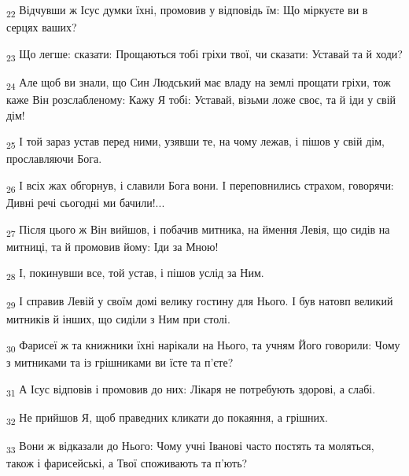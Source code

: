 \begin{tcolorbox}
\textsubscript{22} Відчувши ж Ісус думки їхні, промовив у відповідь їм: Що міркуєте ви в серцях ваших?
\end{tcolorbox}
\begin{tcolorbox}
\textsubscript{23} Що легше: сказати: Прощаються тобі гріхи твої, чи сказати: Уставай та й ходи?
\end{tcolorbox}
\begin{tcolorbox}
\textsubscript{24} Але щоб ви знали, що Син Людський має владу на землі прощати гріхи, тож каже Він розслабленому: Кажу Я тобі: Уставай, візьми ложе своє, та й іди у свій дім!
\end{tcolorbox}
\begin{tcolorbox}
\textsubscript{25} І той зараз устав перед ними, узявши те, на чому лежав, і пішов у свій дім, прославляючи Бога.
\end{tcolorbox}
\begin{tcolorbox}
\textsubscript{26} І всіх жах обгорнув, і славили Бога вони. І переповнились страхом, говорячи: Дивні речі сьогодні ми бачили!...
\end{tcolorbox}
\begin{tcolorbox}
\textsubscript{27} Після цього ж Він вийшов, і побачив митника, на ймення Левія, що сидів на митниці, та й промовив йому: Іди за Мною!
\end{tcolorbox}
\begin{tcolorbox}
\textsubscript{28} І, покинувши все, той устав, і пішов услід за Ним.
\end{tcolorbox}
\begin{tcolorbox}
\textsubscript{29} І справив Левій у своїм домі велику гостину для Нього. І був натовп великий митників й інших, що сиділи з Ним при столі.
\end{tcolorbox}
\begin{tcolorbox}
\textsubscript{30} Фарисеї ж та книжники їхні нарікали на Нього, та учням Його говорили: Чому з митниками та із грішниками ви їсте та п'єте?
\end{tcolorbox}
\begin{tcolorbox}
\textsubscript{31} А Ісус відповів і промовив до них: Лікаря не потребують здорові, а слабі.
\end{tcolorbox}
\begin{tcolorbox}
\textsubscript{32} Не прийшов Я, щоб праведних кликати до покаяння, а грішних.
\end{tcolorbox}
\begin{tcolorbox}
\textsubscript{33} Вони ж відказали до Нього: Чому учні Іванові часто постять та моляться, також і фарисейські, а Твої споживають та п'ють?
\end{tcolorbox}
